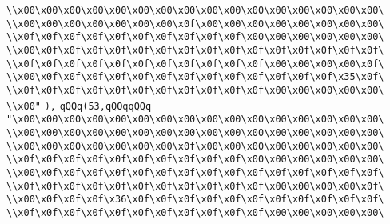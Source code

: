 \verb|\\x00\x00\x00\x00\x00\x00\x00\x00\x00\x00\x00\x00\x00\x00\x00\x00\|\newline
\verb|\\x00\x00\x00\x00\x00\x00\x00\x0f\x00\x00\x00\x00\x00\x00\x00\x00\|\newline
\verb|\\x0f\x0f\x0f\x0f\x0f\x0f\x0f\x0f\x0f\x0f\x00\x00\x00\x00\x00\x00\|\newline
\verb|\\x00\x0f\x0f\x0f\x0f\x0f\x0f\x0f\x0f\x0f\x0f\x0f\x0f\x0f\x0f\x0f\|\newline
\verb|\\x0f\x0f\x0f\x0f\x0f\x0f\x0f\x0f\x0f\x0f\x0f\x00\x00\x00\x00\x0f\|\newline
\verb|\\x00\x0f\x0f\x0f\x0f\x0f\x0f\x0f\x0f\x0f\x0f\x0f\x0f\x0f\x35\x0f\|\newline
\verb|\\x0f\x0f\x0f\x0f\x0f\x0f\x0f\x0f\x0f\x0f\x0f\x00\x00\x00\x00\x00\|\newline
\verb|\\x00"|\newline
\verb|),|\newline
\verb|qQQq(53,qQQqqQQq|\newline
\verb|"\x00\x00\x00\x00\x00\x00\x00\x00\x00\x00\x00\x00\x00\x00\x00\x00\|\newline
\verb|\\x00\x00\x00\x00\x00\x00\x00\x00\x00\x00\x00\x00\x00\x00\x00\x00\|\newline
\verb|\\x00\x00\x00\x00\x00\x00\x00\x0f\x00\x00\x00\x00\x00\x00\x00\x00\|\newline
\verb|\\x0f\x0f\x0f\x0f\x0f\x0f\x0f\x0f\x0f\x0f\x00\x00\x00\x00\x00\x00\|\newline
\verb|\\x00\x0f\x0f\x0f\x0f\x0f\x0f\x0f\x0f\x0f\x0f\x0f\x0f\x0f\x0f\x0f\|\newline
\verb|\\x0f\x0f\x0f\x0f\x0f\x0f\x0f\x0f\x0f\x0f\x0f\x00\x00\x00\x00\x0f\|\newline
\verb|\\x00\x0f\x0f\x0f\x36\x0f\x0f\x0f\x0f\x0f\x0f\x0f\x0f\x0f\x0f\x0f\|\newline
\verb|\\x0f\x0f\x0f\x0f\x0f\x0f\x0f\x0f\x0f\x0f\x0f\x00\x00\x00\x00\x00\|\newline
